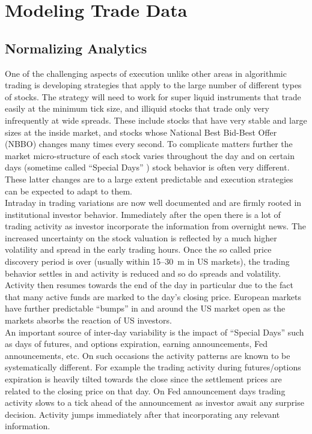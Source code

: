 
\chapter{Modeling Trade Data}

\section{Normalizing Analytics}
One of the challenging aspects of execution unlike other areas in algorithmic trading is developing strategies that apply to the large number of different types of stocks. The strategy will need to work for super liquid instruments that trade easily at the minimum tick size, and illiquid stocks that trade only very infrequently at wide spreads. These include stocks that have very stable and large sizes at the inside market, and stocks whose National Best Bid-Best Offer (NBBO) changes many times every second. To complicate matters further the market micro-structure of each stock varies throughout the day and on certain days (sometime called ``Special Days'' ) stock behavior is often very different. These latter changes are to a large extent predictable and execution strategies can be expected to adapt to them. \\


Intraday in trading variations are now well documented and are firmly rooted in institutional investor behavior. Immediately after the open there is a lot of trading activity as investor incorporate the information from overnight news. The increased uncertainty on the stock valuation is reflected by a much higher volatility and spread in the early trading hours. Once the so called price discovery period is over (usually within 15--30~m in US markets), the trading behavior settles in and activity is reduced and so do spreads and volatility. Activity then resumes towards the end of the day in particular due to the  fact that many active funds are marked to the day's closing price. European markets have further predictable ``bumps'' in and around the US market open as the markets absorbs the reaction of US investors. \\


An important source of inter-day variability is the impact of ``Special Days'' such as days of futures, and options expiration, earning announcements, Fed announcements, etc. On such occasions the activity patterns are known to be systematically different. For  example the trading activity during futures/options expiration is heavily tilted towards the close since the settlement prices are related to the closing price on that day. On Fed announcement days trading activity slows to a tick ahead of the announcement as investor await any surprise decision. Activity jumps immediately after that incorporating any relevant information.


